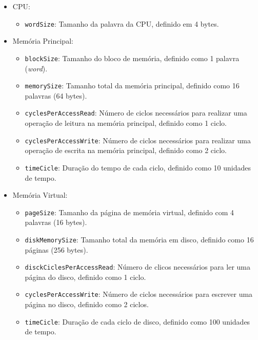 \documentclass[
	12pt,				%
	oneside,   	        %
	a4paper,			%
	english,			%
	french,				%
	spanish,			%
	brazil,				%
	]{pacotes/abntex2}
\begin{document}
\begin{itemize}
    \item CPU:
        \begin{itemize}
            \item \texttt{wordSize}: Tamanho da palavra da CPU, definido em 4 bytes.
        \end{itemize}
    
    \item Memória Principal:
        \begin{itemize}
            \item \texttt{blockSize}: Tamanho do bloco de memória, definido como 1 palavra (\textit{word}).

            \item \texttt{memorySize}: Tamanho total da memória principal, definido como 16 palavras (64 bytes).

            \item \texttt{cyclesPerAccessRead}: Número de ciclos necessários para realizar uma operação de leitura na memória principal, definido como 1 ciclo.

            \item \texttt{cyclesPerAccessWrite}: Número de ciclos necessários para realizar uma operação de escrita na memória principal, definido como 2 ciclo.
            
            \item \texttt{timeCicle}: Duração do tempo de cada ciclo, definido como 10 unidades de tempo.
        \end{itemize}
    
    \item Memória Virtual:
        \begin{itemize}
            \item \texttt{pageSize}: Tamanho da página de memória virtual, definido com 4 palavras (16 bytes).

            \item \texttt{diskMemorySize}: Tamanho total da memória em disco, definido como 16 páginas (256 bytes).

            \item \texttt{disckCiclesPerAccessRead}: Número de clicos necessários para ler uma página do disco, definido como 1 ciclo.

            \item \texttt{cyclesPerAccessWrite}: Número de ciclos necessários para escrever uma página no disco, definido como 2 ciclos.
            
            \item \texttt{timeCicle}: Duração de cada ciclo de disco, definido como 100 unidades de tempo.
        \end{itemize}
    
\end{itemize}
\end{document}
